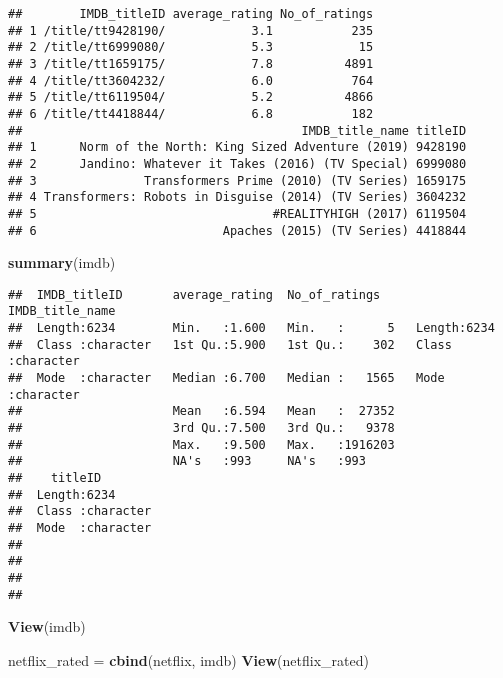 \documentclass[]{article}
\newenvironment{Shaded}{\begin{snugshade}}{\end{snugshade}}
\newcommand{\KeywordTok}[1]{\textcolor[rgb]{0.13,0.29,0.53}{\textbf{#1}}}
\newcommand{\NormalTok}[1]{#1}
\newcommand{\StringTok}[1]{\textcolor[rgb]{0.31,0.60,0.02}{#1}}
\begin{document}
\begin{verbatim}
##        IMDB_titleID average_rating No_of_ratings
## 1 /title/tt9428190/            3.1           235
## 2 /title/tt6999080/            5.3            15
## 3 /title/tt1659175/            7.8          4891
## 4 /title/tt3604232/            6.0           764
## 5 /title/tt6119504/            5.2          4866
## 6 /title/tt4418844/            6.8           182
##                                       IMDB_title_name titleID
## 1      Norm of the North: King Sized Adventure (2019) 9428190
## 2      Jandino: Whatever it Takes (2016) (TV Special) 6999080
## 3               Transformers Prime (2010) (TV Series) 1659175
## 4 Transformers: Robots in Disguise (2014) (TV Series) 3604232
## 5                                 #REALITYHIGH (2017) 6119504
## 6                          Apaches (2015) (TV Series) 4418844
\end{verbatim}

\begin{Shaded}
\begin{Highlighting}[]
\KeywordTok{summary}\NormalTok{(imdb)}
\end{Highlighting}
\end{Shaded}

\begin{verbatim}
##  IMDB_titleID       average_rating  No_of_ratings     IMDB_title_name   
##  Length:6234        Min.   :1.600   Min.   :      5   Length:6234       
##  Class :character   1st Qu.:5.900   1st Qu.:    302   Class :character  
##  Mode  :character   Median :6.700   Median :   1565   Mode  :character  
##                     Mean   :6.594   Mean   :  27352                     
##                     3rd Qu.:7.500   3rd Qu.:   9378                     
##                     Max.   :9.500   Max.   :1916203                     
##                     NA's   :993     NA's   :993                         
##    titleID         
##  Length:6234       
##  Class :character  
##  Mode  :character  
##                    
##                    
##                    
## 
\end{verbatim}

\begin{Shaded}
\begin{Highlighting}[]
\KeywordTok{View}\NormalTok{(imdb)}
\end{Highlighting}
\end{Shaded}

\begin{Shaded}
\begin{Highlighting}[]
\NormalTok{netflix_rated =}\StringTok{ }\KeywordTok{cbind}\NormalTok{(netflix, imdb)}
\KeywordTok{View}\NormalTok{(netflix_rated)}
\end{Highlighting}
\end{Shaded}
\end{document}
